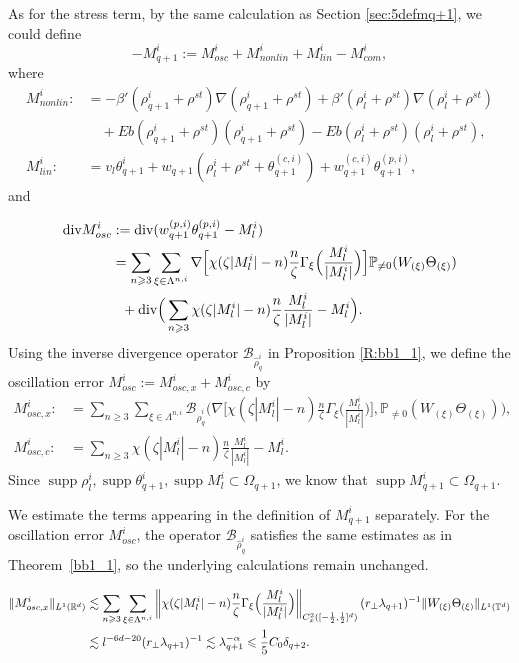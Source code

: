 \documentclass[UTF-8,reqno]{amsart}
\numberwithin{equation}{section}
\theoremstyle{definition}
\DeclareMathOperator{\supp}{supp}
\def\[{{\Big[}}
\def\]{{\Big]}}
\def\({{\Big(}}
\def\){{\Big)}}
\newcommand{\norm}[1]{\left\|#1\right\|}
\def\mP{{\mathbb P}}
\def\geq{\geqslant}
\def\leq{\leqslant}
\def\div{\mathord{{\rm div}}}
\def\[{{\Big[}}
\def\]{{\Big]}}
\def\({{\Big(}}
\def\){{\Big)}}
\def\geq{\geqslant}
\def\leq{\leqslant}
\def\div{\mathord{{\rm div}}}
\begin{document}
 
 As for the stress term, by the same calculation as Section \ref{sec:5defmq+1}, we could  define 
$$-{M}^i _{q+1}:=M^i_{osc}+M^i_{nonlin}+M^i_{lin}-M^i_{com},$$
where 
\begin{align*}
M^i_{nonlin}: 
&=-  \beta'(\rho^i_{q+1}+\rho^{st} )  \nabla (\rho^i_{q+1}+\rho^{st} )+ \beta'(\rho^i_{l}+\rho^{st} )\nabla( \rho^i_{l}+\rho^{st}) \\
&\quad +Eb( \rho_{q+1}^i+\rho^{st})( \rho_{q+1}^i+\rho^{st})  -Eb(\rho_{l}^i+\rho^{st})(\rho_{l}^i+\rho^{st}) ,\\
M^i_{lin}:&=v_l\theta^i _{q+1}+w_{q+1}  (\rho^i_l+\rho^{st}+\theta_{q+1}^{(c,i)})+w_{q+1}^{(c,i)}\theta_{q+1}^{(p,i)},
\end{align*}  
and 

\begin{align*}
 \div M^i_{osc}&:=\div (w_{q+1}^{(p,i)}\theta_{q+1}^{(p,i)}-M^i_l)\\
 &=\sum_{n\geq3}\sum_{\xi\in\Lambda^{n,i}}\nabla\[\chi(\zeta |M^i_l|-n)\frac{n}{\zeta }\Gamma_{\xi}\(\frac{M^i_l}{|M^i_l|}\)\]\mP_{\neq0}(W_{ (\xi)}\Theta_{ (\xi)})\notag\\
 &\ \ +\div \(\sum_{n\geq3}\chi(\zeta |M^i_l|-n)\frac{n}{\zeta }\frac{M^i_l}{|M^i_l|}-M^i_l\). 
\end{align*} 
Using  the inverse divergence operator  $\mathcal{B}_{\hat{\rho}_q^i}$ in Proposition \ref{R:bb1_1}, we  define  the  oscillation error $M^i_{osc}:=M^i_{osc,x}+M^i_{osc,c}$  by
\begin{align*} M^i_{osc,x}:&=\sum_{n\geq3}\sum_{\xi\in\Lambda^{n,i}}\mathcal{B}_{\hat{\rho}_q^i}\(\nabla\[\chi(\zeta |M^i_l|-n)\frac{n}{\zeta }\Gamma_{\xi}\(\frac{M^i_l}{|M^i_l|}\)\],\mathbb{P}_{\neq0}(W_{ (\xi)}\Theta_{ (\xi)})\),\\
   M^i_{osc,c}:&=\sum_{n\geq3}\chi(\zeta |M^i_l|-n)\frac{n}{\zeta }\frac{M^i_l}{|M^i_l|}- M^i_l.
\end{align*}
Since $\supp \rho^i_l,\supp \theta_{q+1}^i,\supp M_l^i\subset\Omega_{q+1}$, we know that $\supp M_{q+1}^i\subset\Omega_{q+1}$. 




We estimate the terms appearing in the definition of $M^i_{q+1}$ separately. For the oscillation error $M^i_{ {osc}}$, the operator $\mathcal{B}_{\hat{\rho}_q^i}$ satisfies the same estimates as in Theorem~\ref{bb1_1}, so the underlying calculations remain unchanged.

\begin{align}
\|M^i_{osc,x} \|_{L^1(\mathbb{R}^d)}
&\lesssim\sum_{n\geq3}\sum_{\xi\in\Lambda^{n,i}}\norm{\chi(\zeta |M^i_l|-n)\frac{n}{\zeta }\Gamma_{\xi}\(\frac{M^i_l}{|M^i_l|}\)}_{C_{x}^2([-\frac12,\frac12]^d)}(r_\perp\lambda_{q+1})^{-1}\|W_{ (\xi)}\Theta_{ (\xi)}\|_{L^{1}(\mathbb{T}^d)}\notag\\
&\lesssim l^{-6d-20}(r_\perp\lambda_{q+1})^{-1} 
\lesssim  \lambda_{q+1}^{-\alpha}\leq  \frac15C_0\delta_{q+2}.\notag
\end{align} 
\end{document}
